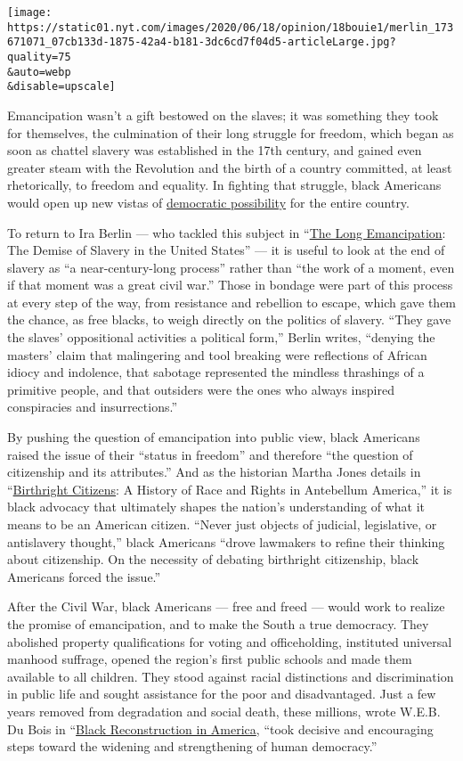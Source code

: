 \texttt{[image: https://static01.nyt.com/images/2020/06/18/opinion/18bouie1/merlin\_173671071\_07cb133d-1875-42a4-b181-3dc6cd7f04d5-articleLarge.jpg?quality=75\\\&auto=webp\\\&disable=upscale]}

Emancipation wasn't a gift bestowed on the slaves; it was something they
took for themselves, the culmination of their long struggle for freedom,
which began as soon as chattel slavery was established in the 17th
century, and gained even greater steam with the Revolution and the birth
of a country committed, at least rhetorically, to freedom and equality.
In fighting that struggle, black Americans would open up new vistas of
\href{https://www.nytimes.com/interactive/2019/08/14/magazine/black-history-american-democracy.html}{democratic
possibility} for the entire country.

To return to Ira Berlin --- who tackled this subject in
``\href{https://www.hup.harvard.edu/catalog.php?isbn=9780674286085}{The
Long Emancipation}: The Demise of Slavery in the United States'' --- it
is useful to look at the end of slavery as ``a near-century-long
process'' rather than ``the work of a moment, even if that moment was a
great civil war.'' Those in bondage were part of this process at every
step of the way, from resistance and rebellion to escape, which gave
them the chance, as free blacks, to weigh directly on the politics of
slavery. ``They gave the slaves' oppositional activities a political
form,'' Berlin writes, ``denying the masters' claim that malingering and
tool breaking were reflections of African idiocy and indolence, that
sabotage represented the mindless thrashings of a primitive people, and
that outsiders were the ones who always inspired conspiracies and
insurrections.''

By pushing the question of emancipation into public view, black
Americans raised the issue of their ``status in freedom'' and therefore
``the question of citizenship and its attributes.'' And as the historian
Martha Jones details in
``\href{https://marthasjones.com/birthright-citizens/}{Birthright
Citizens}: A History of Race and Rights in Antebellum America,'' it is
black advocacy that ultimately shapes the nation's understanding of what
it means to be an American citizen. ``Never just objects of judicial,
legislative, or antislavery thought,'' black Americans ``drove lawmakers
to refine their thinking about citizenship. On the necessity of debating
birthright citizenship, black Americans forced the issue.''

After the Civil War, black Americans --- free and freed --- would work
to realize the promise of emancipation, and to make the South a true
democracy. They abolished property qualifications for voting and
officeholding, instituted universal manhood suffrage, opened the
region's first public schools and made them available to all children.
They stood against racial distinctions and discrimination in public life
and sought assistance for the poor and disadvantaged. Just a few years
removed from degradation and social death, these millions, wrote W.E.B.
Du Bois in ``\href{http://www.webdubois.org/wdb-BlackReconst.html}{Black
Reconstruction in America}, ``took decisive and encouraging steps toward
the widening and strengthening of human democracy.''

